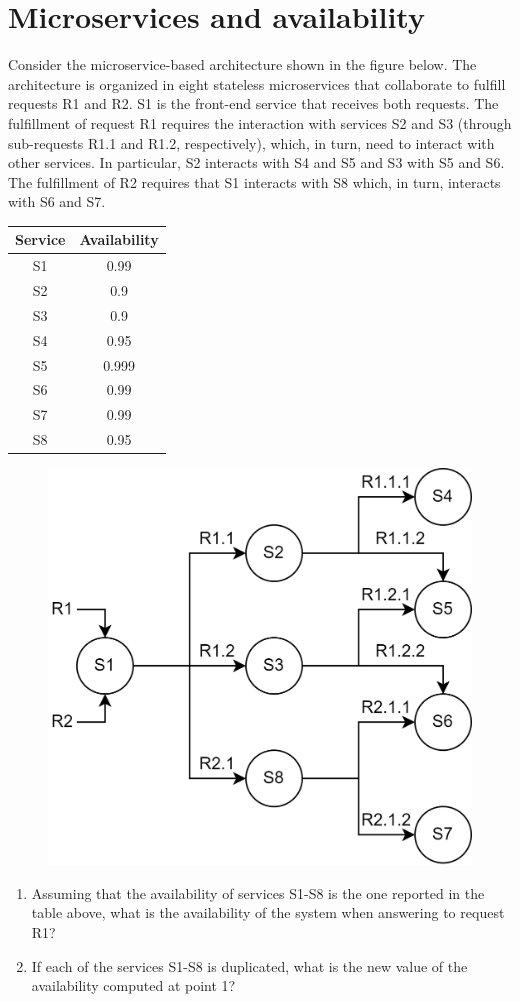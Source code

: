 \section{Microservices and availability}

Consider the microservice-based architecture shown in the figure below. 
The architecture is organized in eight stateless microservices that collaborate to fulfill requests R1 and R2. 
S1 is the front-end service that receives both requests. 
The fulfillment of request R1 requires the interaction with services S2 and S3 (through sub-requests R1.1 and R1.2, respectively), which, in turn, need to interact with other services. 
In particular, S2 interacts with S4 and S5 and S3 with S5 and S6.
The fulfillment of R2 requires that S1 interacts with S8 which, in turn, interacts with S6 and S7.

\begin{table}[H]
    \centering
    \begin{tabular}{cc}
    \hline
    \textbf{Service} & \textbf{Availability} \\ \hline
    S1      & 0.99         \\
    S2      & 0.9          \\
    S3      & 0.9          \\
    S4      & 0.95         \\
    S5      & 0.999        \\
    S6      & 0.99         \\
    S7      & 0.99         \\
    S8      & 0.95         \\ \hline
    \end{tabular}
    \end{table}
\begin{figure}[H]
    \centering
    \includegraphics[width=0.5\linewidth]{images/micro.png}
\end{figure}
\begin{enumerate}
    \item Assuming that the availability of services S1-S8 is the one reported in the table above, what is the availability of the system when answering to request R1?
    \item If each of the services S1-S8 is duplicated, what is the new value of the availability computed at point 1?
\end{enumerate}

